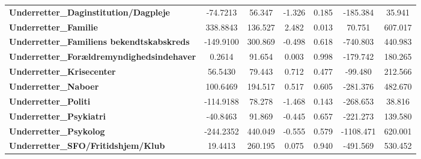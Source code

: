 \begin{center}
\begin{tabular}{lcccccc}
\textbf{Underretter\_Daginstitution/Dagpleje}                                                                                  &     -74.7213  &       56.347     &    -1.326  &         0.185        &     -185.384    &       35.941     \\
\textbf{Underretter\_Familie}                                                                                                  &     338.8843  &      136.527     &     2.482  &         0.013        &       70.751    &      607.017     \\
\textbf{Underretter\_Familiens bekendtskabskreds}                                                                              &    -149.9100  &      300.869     &    -0.498  &         0.618        &     -740.803    &      440.983     \\
\textbf{Underretter\_Forældremyndighedsindehaver}                                                                              &       0.2614  &       91.654     &     0.003  &         0.998        &     -179.742    &      180.265     \\
\textbf{Underretter\_Krisecenter}                                                                                              &      56.5430  &       79.443     &     0.712  &         0.477        &      -99.480    &      212.566     \\
\textbf{Underretter\_Naboer}                                                                                                   &     100.6469  &      194.517     &     0.517  &         0.605        &     -281.376    &      482.670     \\
\textbf{Underretter\_Politi}                                                                                                   &    -114.9188  &       78.278     &    -1.468  &         0.143        &     -268.653    &       38.816     \\
\textbf{Underretter\_Psykiatri}                                                                                                &     -40.8463  &       91.869     &    -0.445  &         0.657        &     -221.273    &      139.580     \\
\textbf{Underretter\_Psykolog}                                                                                                 &    -244.2352  &      440.049     &    -0.555  &         0.579        &    -1108.471    &      620.001     \\
\textbf{Underretter\_SFO/Fritidshjem/Klub}                                                                                     &      19.4413  &      260.195     &     0.075  &         0.940        &     -491.569    &      530.452     \\

\end{tabular}
\end{center}
